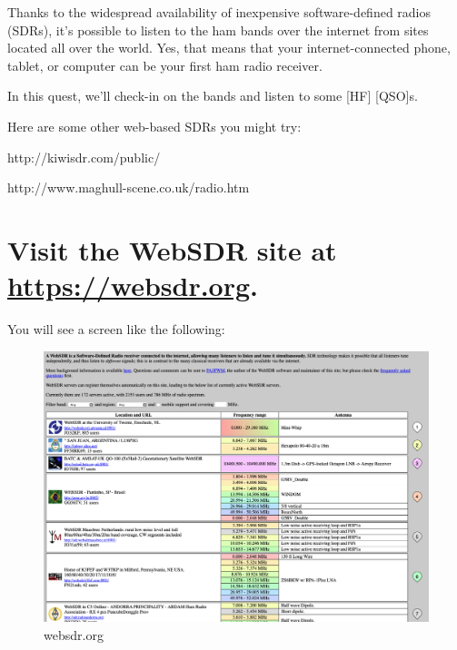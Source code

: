 \documentclass[
  letterpaper,
  DIV=11,
  numbers=noendperiod]{scrreport}
\begin{document}

Thanks to the widespread availability of inexpensive software-defined
radios (SDRs), it's possible to listen to the ham bands over the
internet from sites located all over the world. Yes, that means that
your internet-connected phone, tablet, or computer can be your first ham
radio receiver.

In this quest, we'll check-in on the bands and listen to some {[}HF{]}
{[}QSO{]}s.

Here are some other web-based SDRs you might try:

http://kiwisdr.com/public/

http://www.maghull-scene.co.uk/radio.htm

\hypertarget{visit-the-websdr-site-at-httpswebsdr.org.}{%
\section*{\texorpdfstring{Visit the WebSDR site at
\url{https://websdr.org}.}{Visit the WebSDR site at https://websdr.org.}}\label{visit-the-websdr-site-at-httpswebsdr.org.}}


You will see a screen like the following:

\begin{figure}

{\centering \includegraphics{include/img/websdr-org.png}

}

\caption{websdr.org}

\end{figure}
\end{document}
